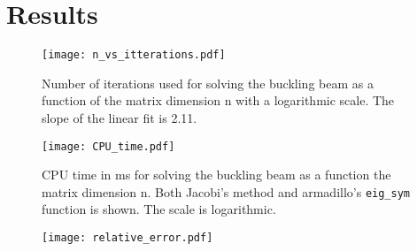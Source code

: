\section{Results}
\label{sec:results}

\begin{figure}[htbp]
	\centering
	\texttt{[image: n\_vs\_itterations.pdf]}
	\caption{Number of iterations used for solving the buckling beam as a function of the matrix dimension n with a logarithmic scale. The slope of the linear fit is 2.11.}
	\label{fig:n_vs_it}
\end{figure}

\begin{figure}[htbp]
	\centering
	\texttt{[image: CPU\_time.pdf]}
	\caption{CPU time in ms for solving the buckling beam as a function the matrix dimension n. Both Jacobi's method and armadillo's \texttt{eig\_sym} function is shown. The scale is logarithmic.}
	\label{fig:CPUtime}
\end{figure}

\begin{figure}[htbp]
	\centering
	\texttt{[image: relative\_error.pdf]}
	\caption{}
	\label{fig:error}
\end{figure}

